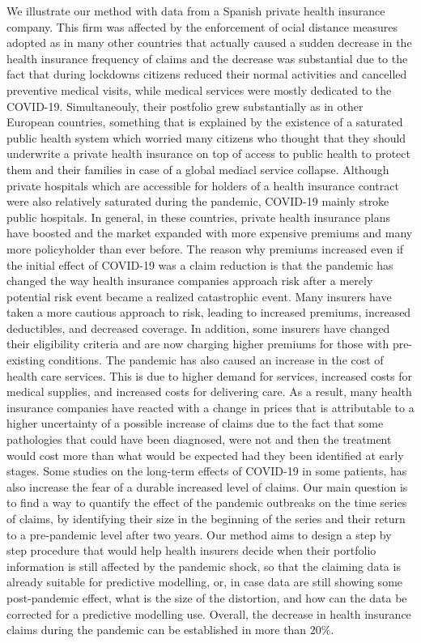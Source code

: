 \documentclass[12pt]{article}
\theoremstyle{definition}
\theoremstyle{remark}
\begin{document}
We illustrate our method with data from a Spanish private health insurance company. This firm was affected by the enforcement of ocial distance measures adopted as in many other countries that actually caused a sudden decrease in the health insurance frequency of claims and the decrease was substantial due to the fact that during lockdowns citizens reduced their normal activities and cancelled preventive medical visits, while medical services were mostly dedicated to the COVID-19. Simultaneouly, their postfolio grew substantially as in other European countries, something that is explained by the existence of a saturated public health system which worried many citizens who thought that they should underwrite a private health insurance on top of access to public health to protect them and their families in case of a global mediacl service collapse. Although private hospitals which are accessible for holders of a health insurance contract were also relatively saturated during the pandemic, COVID-19 mainly stroke public hospitals. In general, in these countries, private health insurance plans have boosted and the market expanded with more expensive premiums and many more policyholder than ever before.
The reason why premiums increased even if the initial effect of COVID-19 was a claim reduction is that the pandemic has changed the way health insurance companies approach risk after a merely potential risk event became a realized catastrophic event. Many insurers have taken a more cautious approach to risk, leading to increased premiums, increased deductibles, and decreased coverage. In addition, some insurers have changed their eligibility criteria and are now charging higher premiums for those with pre-existing conditions. The pandemic has also caused an increase in the cost of health care services. This is due to higher demand for services, increased costs for medical supplies, and increased costs for delivering care. As a result, many health insurance companies have reacted with a change in prices that is attributable to a higher uncertainty of a possible increase of claims due to the fact that some pathologies that could have been diagnosed, were not and then the treatment would cost more than what would be expected had they been identified at early stages. Some studies on the long-term effects of COVID-19 in some patients, has also increase the fear of a durable increased level of claims. 
Our main question is to find a way to quantify the effect of the pandemic outbreaks on the time series of claims, by identifying their size in the beginning of the series and their return to a pre-pandemic level after two years. Our method aims to design a step by step procedure that would help health insurers decide when their portfolio information is still affected by the pandemic shock, so that the claiming data is already suitable for predictive modelling, or, in case data are still showing some post-pandemic effect, what is the size of the distortion, and how can the data be corrected for a predictive modelling use.
Overall, the decrease in health insurance claims during the pandemic can be established in more than 20\%.
\end{document}
